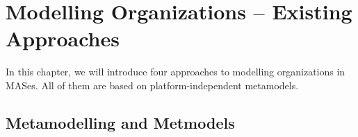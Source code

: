 
\chapter{Modelling Organizations -- Existing Approaches}

In this chapter, we will introduce four approaches to modelling organizations in MASes.
All of them are based on platform-independent metamodels.

\section{Metamodelling and Metmodels}







